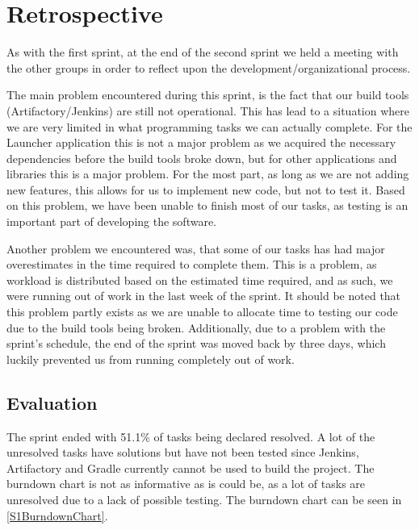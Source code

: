 \section{Retrospective}\label{S2Retro}
As with the first sprint, at the end of the second sprint we held a meeting with
the other groups in order to reflect upon the development/organizational
process.\nl

The main problem encountered during this sprint, is the fact that our build
tools (Artifactory/Jenkins) are still not operational. This has lead to a
situation where we are very limited in what programming tasks we can actually
complete. For the Launcher application this is not a major problem as we
acquired the necessary dependencies before the build tools broke down, but for
other applications and libraries this is a major problem. For the most part, as
long as we are not adding new features, this allows for us to implement new
code, but not to test it. Based on this problem, we have been unable to finish
most of our tasks, as testing is an important part of developing the
software.\nl

Another problem we encountered was, that some of our tasks has had major
overestimates in the time required to complete them. This is a problem, as
workload is distributed based on the estimated time required, and as such, we
were running out of work in the last week of the sprint. It should be noted that
this problem partly exists as we are unable to allocate time to testing our code
due to the build tools being broken. Additionally, due to a problem with the
sprint's schedule, the end of the sprint was moved back by three days, which
luckily prevented us from running completely out of work.

\subsection{Evaluation}
The sprint ended with 51.1\% of tasks being declared resolved. A lot of the
unresolved tasks have solutions but have not been tested since Jenkins,
Artifactory and Gradle currently cannot be used to build the project.
The burndown chart is not as informative as is could
be, as a lot of tasks are unresolved due to a lack of
possible testing. The burndown chart can be seen in \autoref{S1BurndownChart}.






